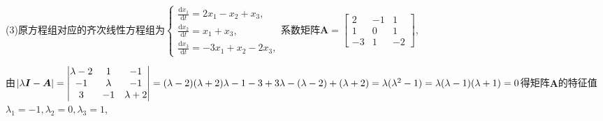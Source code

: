 \documentclass[12pt,UTF8]{ctexart}
\newcommand{\dd}[2]{\frac{\mathrm d #1}{\mathrm d #2}}
\begin{document}
\begin{enumerate}
(3)原方程组对应的齐次线性方程组为$\begin{cases}
\dd{x_1}t=2x_1-x_2+x_3,\\
\dd{x_2}t=x_1+x_3,\\
\dd{x_3}t=-3x_1+x_2-2x_3,
\end{cases}$系数矩阵$\bm A=\begin{bmatrix}2&-1&1\\1&0&1\\-3&1&-2\end{bmatrix}$,

由$|\lambda\bm I-\bm A|=\begin{vmatrix}
\lambda-2&1&-1\\
-1&\lambda&-1\\
3&-1&\lambda+2
\end{vmatrix}=(\lambda-2)(\lambda+2)\lambda-1-3+3\lambda-(\lambda-2)+(\lambda+2)=\lambda(\lambda^2-1)\\
=\lambda(\lambda-1)(\lambda+1)=0$得矩阵$\bm A$的特征值$\lambda_1=-1,\lambda_2=0,\lambda_3=1$,


\end{enumerate}
\end{document}
